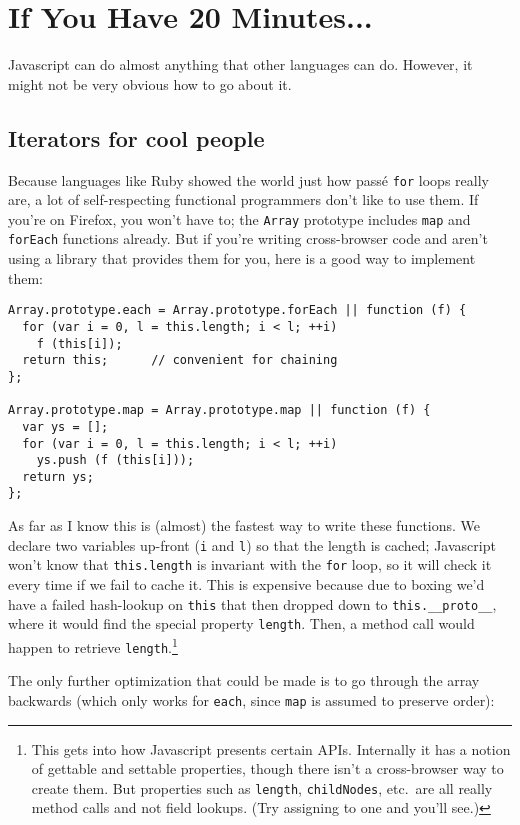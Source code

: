 \documentclass{article}
\begin{document}
\section {If You Have 20 Minutes...}
  Javascript can do almost anything that other languages can do. However, it might not be very obvious how to go about it.

\subsection {Iterators for cool people}
    Because languages like Ruby showed the world just how pass\'e \verb|for| loops really are, a lot of self-respecting functional programmers don't like to use them. If you're on Firefox, you
    won't have to; the \verb|Array| prototype includes \verb|map| and \verb|forEach| functions already. But if you're writing cross-browser code and aren't using a library that provides them
    for you, here is a good way to implement them:

\begin{verbatim}
Array.prototype.each = Array.prototype.forEach || function (f) {
  for (var i = 0, l = this.length; i < l; ++i)
    f (this[i]);
  return this;      // convenient for chaining
};

Array.prototype.map = Array.prototype.map || function (f) {
  var ys = [];
  for (var i = 0, l = this.length; i < l; ++i)
    ys.push (f (this[i]));
  return ys;
};
\end{verbatim}

    As far as I know this is (almost) the fastest way to write these functions. We declare two variables up-front (\verb|i| and \verb|l|) so that the length is cached; Javascript won't know
    that \verb|this.length| is invariant with the \verb|for| loop, so it will check it every time if we fail to cache it. This is expensive because due to boxing we'd have a failed hash-lookup
    on \verb|this| that then dropped down to \verb|this.__proto__|, where it would find the special property \verb|length|. Then, a method call would happen to retrieve
    \verb|length|.\footnote{This gets into how Javascript presents certain APIs. Internally it has a notion of gettable and settable properties, though there isn't a cross-browser way to
    create them. But properties such as {\tt length}, {\tt childNodes}, etc.~are all really method calls and not field lookups. (Try assigning to one and you'll see.)}

    The only further optimization that could be made is to go through the array backwards (which only works for \verb|each|, since \verb|map| is assumed to preserve order):
\end{document}
